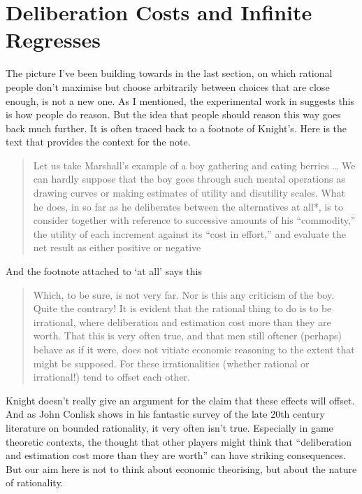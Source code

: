 \documentclass[
  11pt,
]{book}
\begin{document}
\hypertarget{deliberationcosts}{%
\section{Deliberation Costs and Infinite Regresses}\label{deliberationcosts}}

The picture I've been building towards in the last section, on which rational people don't maximise but choose arbitrarily between choices that are close enough, is not a new one. As I mentioned, the experimental work in \citet{Reutskaja2011} suggests this is how people do reason. But the idea that people should reason this way goes back much further. It is often traced back to a footnote of Knight's. Here is the text that provides the context for the note.

\begin{quote}
Let us take Marshall's example of a boy gathering and eating berries \ldots{} We can hardly suppose that the boy goes through such mental operations as drawing curves or making estimates of utility and disutility scales. What he does, in so far as he deliberates between the alternatives at all*, is to consider together with reference to successive amounts of his ``commodity,'' the utility of each increment against its ``cost in effort,'' and evaluate the net result as either positive or negative \citep[ 66-7]{Knight1921}
\end{quote}

And the footnote attached to `at all' says this

\begin{quote}
Which, to be sure, is not very far. Nor is this any criticism of the boy. Quite the contrary! It is evident that the rational thing to do is to be irrational, where deliberation and estimation cost more than they are worth. That this is very often true, and that men still oftener (perhaps) behave as if it were, does not vitiate economic reasoning to the extent that might be supposed. For these irrationalities (whether rational or irrational!) tend to offset each other. \citep[ 67fn1]{Knight1921}
\end{quote}

Knight doesn't really give an argument for the claim that these effects will offset. And as John Conlisk \citeyearpar{Conlisk1996} shows in his fantastic survey of the late 20th century literature on bounded rationality, it very often isn't true. Especially in game theoretic contexts, the thought that other players might think that ``deliberation and estimation cost more than they are worth'' can have striking consequences. But our aim here is not to think about economic theorising, but about the nature of rationality.
\end{document}
